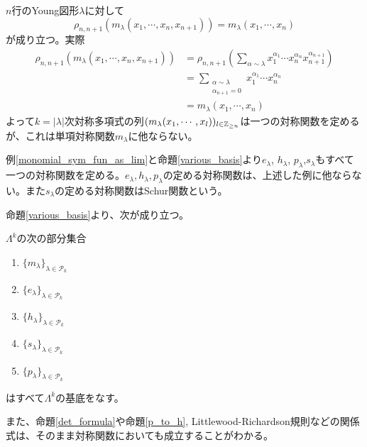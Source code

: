 \documentclass{ltjsreport}
\begin{document}
\begin{eg}\label{monomial_sym_fun_as_lim}
  $n$行のYoung図形$\lambda$に対して
  \[
  \rho_{n,n+1}(m_\lambda(x_1,\cdots,x_n,x_{n+1}))=m_\lambda(x_1,\cdots,x_n)  
  \]
  が成り立つ。実際
  \begin{align*}
    \rho_{n,n+1}(m_\lambda(x_1,\cdots,x_n,x_{n+1}))
    &=\rho_{n,n+1}\left(
      \sum_{\alpha\sim\lambda}x_1^{\alpha_1}\cdots x_n^{\alpha_n}x_{n+1}^{\alpha_{n+1}}
      \right)\\
    &=\sum_{\substack{\alpha\sim\lambda \\ \alpha_{n+1}=0}}x_1^{\alpha_1}\cdots x_n^{\alpha_n}\\
    &=m_\lambda(x_1,\cdots,x_n)
  \end{align*}
  よって$k=|\lambda|$次対称多項式の列$(m_\lambda(x_1,\cdots,x_l))_{l\in\mathbb{Z}_{\geq n}}$は一つの対称関数を定めるが、これは単項対称関数$m_\lambda$に他ならない。
\end{eg}

\begin{eg}
  例\ref{monomial_sym_fun_as_lim}と命題\ref{various_basis}より$e_\lambda$, $h_\lambda$, $p_\lambda$,$s_\lambda$もすべて一つの対称関数を定める。$e_\lambda,h_\lambda,p_\lambda$の定める対称関数は、上述した例に他ならない。また$s_\lambda$の定める対称関数はSchur関数という。
\end{eg}

命題\ref{various_basis}より、次が成り立つ。

\begin{prop}\label{various_symfunc_basis}
  $\Lambda^k$の次の部分集合
  \begin{enumerate}
    \item $\{m_\lambda\}_{\lambda\in\mathcal{P}_k}$
    \item $\{e_\lambda\}_{\lambda\in\mathcal{P}_k}$
    \item $\{h_\lambda\}_{\lambda\in\mathcal{P}_k}$
    \item $\{s_\lambda\}_{\lambda\in\mathcal{P}_k}$
    \item $\{p_\lambda\}_{\lambda\in\mathcal{P}_k}$
  \end{enumerate}
  はすべて$\Lambda^k$の基底をなす。
\end{prop}

また、命題\ref{det_formula}や命題\ref{p_to_h}, Littlewood-Richardson規則などの関係式は、そのまま対称関数においても成立することがわかる。
\end{document}
